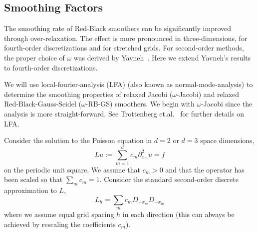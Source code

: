 \documentclass[12pt]{article}
\begin{document}

\newcommand{\thetav}{\boldsymbol{\theta}}

\subsection{Smoothing Factors}

   The smoothing rate of Red-Black smoothers can be significantly improved through
over-relaxation. 
The effect is more pronounced in three-dimensions,
for fourth-order discretizations and for stretched grids.
For second-order methods, the proper choice of $\omega$ was derived by Yavneh~\cite{Yavneh96}. 
Here we extend Yavneh's results to fourth-order discretizations.



We will use local-fourier-analysis (LFA) (also known as normal-mode-analysis)
to determine the smoothing properties
of relaxed Jacobi ($\omega$-Jacobi) and relaxed Red-Black-Gauss-Seidel ($\omega$-RB-GS) smoothers.
We begin with $\omega$-Jacobi since the analysis is more straight-forward. See Trottenberg et.al.~\cite{Trottenberg2001}
for further details on LFA.

Consider the solution to the Poisson equation in $d=2$ or $d=3$ space dimensions,
\[
     L u := \sum_{m=1}^d c_m \partial_{x_m}^2 u  = f
\]
on the periodic unit square. 
We assume that $c_m>0$ and that the operator has been scaled so that
$\sum_m c_m =1$.
Consider the standard second-order discrete approximation to $L$, 
\[
   L_h = \sum_m c_m D_{+x_m}D_{-x_m} 
\]
where we assume equal grid spacing $h$ in each direction (this can always be achieved by rescaling
the coefficients $c_m$).
\end{document}
